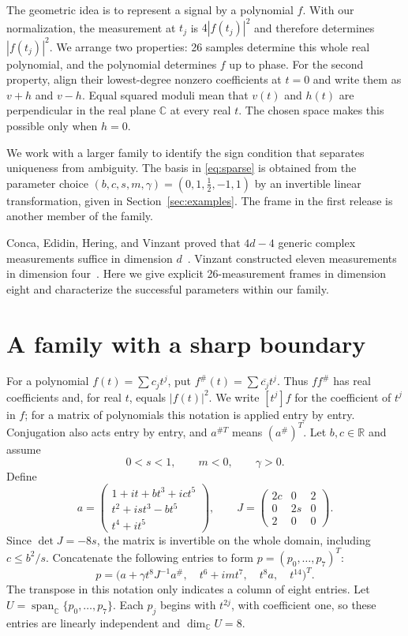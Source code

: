 \documentclass[11pt,a4paper]{article}
\newcommand{\CC}{\mathbb C}
\newcommand{\RR}{\mathbb R}
\begin{document}
The geometric idea is to represent a signal by a polynomial $f$.
With our normalization, the measurement at $t_j$ is $4|f(t_j)|^2$
and therefore determines $|f(t_j)|^2$.
We arrange two properties: 26 samples determine this whole real polynomial,
and the polynomial determines $f$ up to phase. For the second property,
align their lowest-degree nonzero coefficients at $t=0$ and write them as
$v+h$ and $v-h$. Equal squared moduli mean that $v(t)$ and $h(t)$ are
perpendicular in the real plane $\CC$ at every real $t$.
The chosen space makes this possible only when $h=0$.

We work with a larger family to identify the sign condition that separates
uniqueness from ambiguity. The basis in \eqref{eq:sparse} is obtained from
the parameter choice $(b,c,s,m,\gamma)=(0,1,\tfrac12,-1,1)$ by an invertible
linear transformation, given in Section~\ref{sec:examples}. The frame
in the first release is another member of the family.

Conca, Edidin, Hering, and Vinzant proved that $4d-4$ generic complex
measurements suffice in dimension $d$~\cite{CEHV}. Vinzant constructed
eleven measurements in dimension four~\cite{Vinzant}. Here we give explicit
26-measurement frames in dimension eight and characterize the successful
parameters within our family.

\section{A family with a sharp boundary}\label{sec:family}
For a polynomial $f(t)=\sum c_jt^j$, put
$f^\#(t)=\sum\overline{c_j}t^j$. Thus $ff^\#$ has real coefficients and,
for real $t$, equals $|f(t)|^2$.
We write $[t^j]f$ for the coefficient of $t^j$ in $f$; for a matrix of
polynomials this notation is applied entry by entry. Conjugation also
acts entry by entry, and $a^{\#T}$ means $(a^\#)^T$.
Let $b,c\in\RR$ and assume
\begin{equation}\label{eq:domain}
 0<s<1,\qquad m<0,\qquad \gamma>0.
\end{equation}
Define
\begin{equation}\label{eq:seed}
 a=\begin{pmatrix}1+it+bt^3+ict^5\\t^2+ist^3-bt^5\\t^4+it^5\end{pmatrix},
 \qquad J=\begin{pmatrix}2c&0&2\\0&2s&0\\2&0&0\end{pmatrix}.
\end{equation}
Since $\det J=-8s$, the matrix is invertible on the whole domain, including
$c\le b^2/s$. Concatenate the following entries to form $p=(p_0,\ldots,p_7)^T$:
\begin{equation}\label{eq:assembly}
 p=\bigl(a+\gamma t^8J^{-1}a^\#,\quad t^6+imt^7,\quad t^8a,\quad t^{14}\bigr)^T.
\end{equation}
The transpose in this notation only indicates a column of eight entries.
Let $U=\operatorname{span}_{\CC}\{p_0,\ldots,p_7\}$.
Each $p_j$ begins with $t^{2j}$, with coefficient one, so these entries are
linearly independent and $\dim_{\CC}U=8$.
\end{document}
